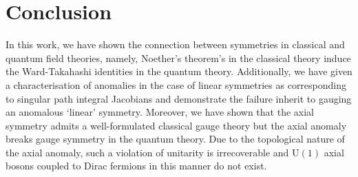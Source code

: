 \documentclass[11pt, a4paper]{article}
\begin{document}
\section{Conclusion}

In this work, we have shown the connection between symmetries in classical
and quantum field theories, namely, Noether's theorem's in the classical
theory induce the Ward-Takahashi identities in the quantum theory.
Additionally, we have given a characterisation
of anomalies in the case of linear symmetries as corresponding to
singular path integral Jacobians and demonstrate the failure inherit to
gauging an anomalous `linear' symmetry. Moreover, we have shown
that the axial symmetry admits a well-formulated classical gauge theory
but the axial anomaly breaks gauge symmetry in the quantum theory.
Due to the topological nature of the axial anomaly, such a violation
of unitarity is irrecoverable and $\mathrm{U}(1)$ axial bosons 
coupled to Dirac fermions in this manner do not exist.

\appendix
\end{document}
